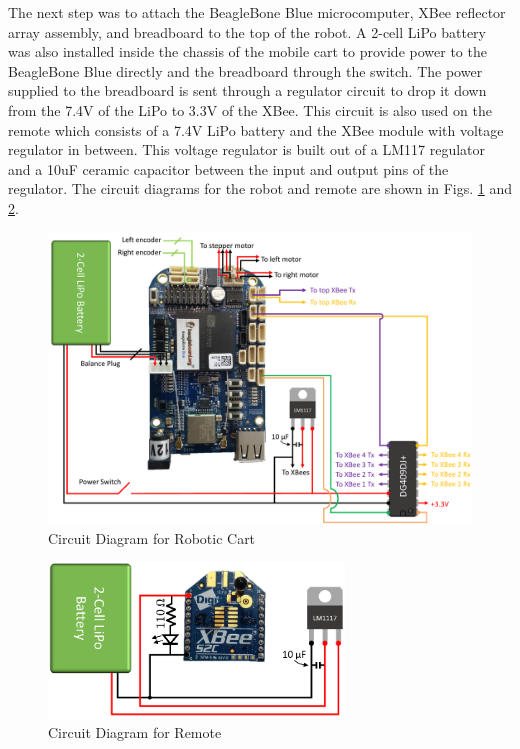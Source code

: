\vspace*{12pt}
\noindent
The next step was to attach the BeagleBone Blue microcomputer, XBee reflector array assembly, and breadboard to the top of the robot. A 2-cell LiPo battery was also installed inside the chassis of the mobile cart to provide power to the BeagleBone Blue directly and the breadboard through the switch. The power supplied to the breadboard is sent through a regulator circuit to drop it down from the 7.4V of the LiPo to 3.3V of the XBee. This circuit is also used on the remote which consists of a 7.4V LiPo battery and the XBee module with voltage regulator in between. This voltage regulator is built out of a LM117 regulator and a 10uF ceramic capacitor between the input and output pins of the regulator. The circuit diagrams for the robot and remote are shown in Figs. \ref{fig:robotCircuit} and \ref{fig:remoteCircuit}.
\begin{figure}[H]
    \centering
    \includegraphics[width=\textwidth]{figs/robotCircuit.pdf}
    \caption{Circuit Diagram for Robotic Cart}
    \label{fig:robotCircuit}
\end{figure}
\begin{figure}[H]
    \centering
    \includegraphics[width=0.7\textwidth]{figs/remoteCircuit.pdf}
    \caption{Circuit Diagram for Remote}
    \label{fig:remoteCircuit}
\end{figure}

